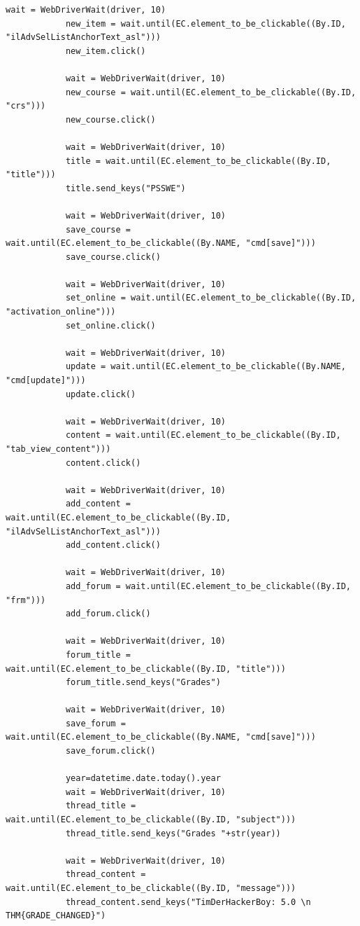 \documentclass[10pt, a4paper,onecolumn ,titlepage]{article}
\begin{document}
\begin{lstlisting}[label={lst:SeleniumSkript}]
            wait = WebDriverWait(driver, 10)
            new_item = wait.until(EC.element_to_be_clickable((By.ID, "ilAdvSelListAnchorText_asl")))
            new_item.click()

            wait = WebDriverWait(driver, 10)
            new_course = wait.until(EC.element_to_be_clickable((By.ID, "crs")))
            new_course.click()

            wait = WebDriverWait(driver, 10)
            title = wait.until(EC.element_to_be_clickable((By.ID, "title")))
            title.send_keys("PSSWE")

            wait = WebDriverWait(driver, 10)
            save_course = wait.until(EC.element_to_be_clickable((By.NAME, "cmd[save]")))
            save_course.click()

            wait = WebDriverWait(driver, 10)
            set_online = wait.until(EC.element_to_be_clickable((By.ID, "activation_online")))
            set_online.click()

            wait = WebDriverWait(driver, 10)
            update = wait.until(EC.element_to_be_clickable((By.NAME, "cmd[update]")))
            update.click()

            wait = WebDriverWait(driver, 10)
            content = wait.until(EC.element_to_be_clickable((By.ID, "tab_view_content")))
            content.click()

            wait = WebDriverWait(driver, 10)
            add_content = wait.until(EC.element_to_be_clickable((By.ID, "ilAdvSelListAnchorText_asl")))
            add_content.click()

            wait = WebDriverWait(driver, 10)
            add_forum = wait.until(EC.element_to_be_clickable((By.ID, "frm")))
            add_forum.click()

            wait = WebDriverWait(driver, 10)
            forum_title = wait.until(EC.element_to_be_clickable((By.ID, "title")))
            forum_title.send_keys("Grades")

            wait = WebDriverWait(driver, 10)
            save_forum = wait.until(EC.element_to_be_clickable((By.NAME, "cmd[save]")))
            save_forum.click()

            year=datetime.date.today().year
            wait = WebDriverWait(driver, 10)
            thread_title = wait.until(EC.element_to_be_clickable((By.ID, "subject")))
            thread_title.send_keys("Grades "+str(year))

            wait = WebDriverWait(driver, 10)
            thread_content = wait.until(EC.element_to_be_clickable((By.ID, "message")))
            thread_content.send_keys("TimDerHackerBoy: 5.0 \n THM{GRADE_CHANGED}")


\end{lstlisting}
\end{document}
